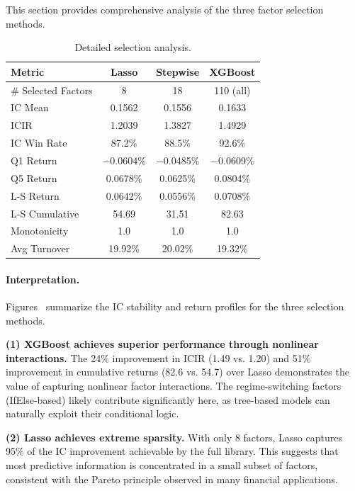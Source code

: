 \documentclass[sigconf]{acmart}
\begin{document}
This section provides comprehensive analysis of the three factor selection methods.

\begin{table}[h]
  \caption{Detailed selection analysis.}
  \centering
  \begin{small}
  \begin{tabular}{lccc}
    \toprule
    Metric & Lasso & Stepwise & XGBoost \\
    \midrule
    \# Selected Factors & 8 & 18 & 110 (all) \\
    IC Mean & 0.1562 & 0.1556 & 0.1633 \\
    ICIR & 1.2039 & 1.3827 & 1.4929 \\
    IC Win Rate & 87.2\% & 88.5\% & 92.6\% \\
    Q1 Return & $-$0.0604\% & $-$0.0485\% & $-$0.0609\% \\
    Q5 Return & 0.0678\% & 0.0625\% & 0.0804\% \\
    L-S Return & 0.0642\% & 0.0556\% & 0.0708\% \\
    L-S Cumulative & 54.69 & 31.51 & 82.63 \\
    Monotonicity & 1.0 & 1.0 & 1.0 \\
    Avg Turnover & 19.92\% & 20.02\% & 19.32\% \\
    \bottomrule
  \end{tabular}
  \end{small}
\end{table}

\paragraph{Interpretation.}
Figures~ summarize the IC stability and return profiles for the three selection methods.

\textbf{(1) XGBoost achieves superior performance through nonlinear interactions.}
The 24\% improvement in ICIR (1.49 vs. 1.20) and 51\% improvement in cumulative returns (82.6 vs. 54.7) over Lasso demonstrates the value of capturing nonlinear factor interactions.
The regime-switching factors (IfElse-based) likely contribute significantly here, as tree-based models can naturally exploit their conditional logic.

\textbf{(2) Lasso achieves extreme sparsity.}
With only 8 factors, Lasso captures 95\% of the IC improvement achievable by the full library.
This suggests that most predictive information is concentrated in a small subset of factors, consistent with the Pareto principle observed in many financial applications.
\end{document}
